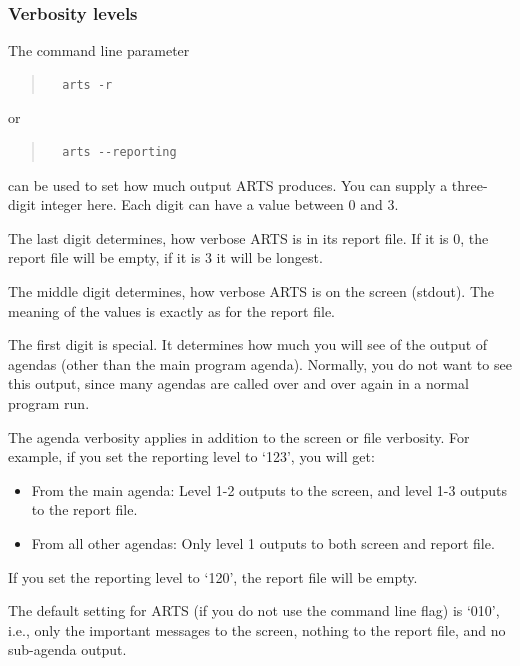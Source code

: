 \subsubsection{Verbosity levels}

The command line parameter 
\begin{quote}
\begin{verbatim}
  arts -r
\end{verbatim}
\end{quote}
or
\begin{quote}
\begin{verbatim}
  arts --reporting
\end{verbatim}
\end{quote}
can be used to set how much output ARTS produces. You can supply a
three-digit integer here. Each digit can have a value between 0 and 3.

The last digit determines, how verbose ARTS
is in its report file. If it is 0, the report file will be empty, if
it is 3 it will be longest.

The middle digit determines, how verbose ARTS is on the screen
(stdout). The meaning of the values is exactly as for the report
file. 

The first digit is special. It determines how much you will see of the
output of agendas (other than the main program agenda). Normally, you
do not want to see this output, since many agendas are called over and
over again in a normal program run. 

The agenda verbosity applies in addition to the screen or file
verbosity. For example, if you set the reporting level to `123', you
will get: 
\begin{itemize}
\item From the main agenda: Level 1-2 outputs to the screen, and level
  1-3 outputs to the report file.
\item From all other agendas: Only level 1 outputs to both screen and
  report file.
\end{itemize}

If you set the reporting level to `120', the report file will be
empty.

The default setting for ARTS (if you do not use the command line flag)
is `010', i.e., only the important messages to the screen, nothing to
the report file, and no sub-agenda output.

